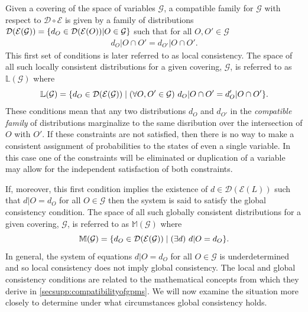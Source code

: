 Given a covering of the space of variables $\mathcal{G}$, a compatible family for $\mathcal{G}$ with respect to $\mathcal{D} \circ \mathcal{E}$ is given by a family of distributions $\mathcal{D}{}(\mathcal{E}{}(\mathcal{G})) = \{d_O \in \mathcal{D} (\mathcal{E}(O)) | O \in \mathcal{G}\}$ such that for all $O, O' \in \mathcal{G}$
\begin{eqnarray}\label{eq:sheafcond}
d_O|O \cap O' = d_{O'}|O \cap O'.
\end{eqnarray}
This first set of conditions is later referred to as local consistency. The space of all such locally consistent distributions for a given covering, $\mathcal{G}$, is referred to as $\mathbb{L}(\mathcal{G})$ where
\begin{equation}
\mathbb{L}(\mathcal{G}) = \{ d_O  \in \mathcal{D}{}(\mathcal{E}{}(\mathcal{G})) \mid (\forall O,O' \in \mathcal{G})\,\, d_O|O \cap O' = d_O'|O \cap O' \}.
\end{equation}
These conditions mean that any two distributions $d_O$ and $d_{O'}$ in the \emph{compatible family} of distributions marginalize to the same disribution over the intersection of $O$ with $O'$. If these constraints are not satisfied, then there is no way to make a consistent assignment of probabilities to the states of even a single variable. In this case one of the constraints will be eliminated or duplication of a variable may allow for the independent satisfaction of both constraints.

If, moreover, this first condition implies the existence of $d \in \mathcal{D}( \mathcal{E}(L))$ such that $d|O = d_O$ for all $O \in \mathcal{G}$ then the system is said to satisfy the global consistency condition. The space of all such globally consistent distributions for a given covering, $\mathcal{G}$, is referred to as $\mathbb{M}(\mathcal{G})$ where
\begin{equation}
\mathbb{M}(\mathcal{G}) = \{ d_O \in \mathcal{D}{}(\mathcal{E}{}(\mathcal{G})) \mid (\exists d ) \,\, d|O = d_O \}.
\end{equation}
In general, the system of equations $d|O = d_O$ for all $O \in \mathcal{G}$ is underdetermined and so local consistency does not imply global consistency. The local and global consistency conditions are related to the mathematical concepts from which they derive in  \autoref{secsupp:compatibilityofgpms}. We will now examine the situation more closely to determine under what circumstances global consistency holds.

